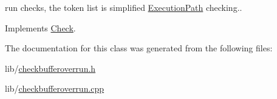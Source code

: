run checks, the token list is simplified \hyperlink{class_execution_path}{Execution\-Path} checking.. 

Implements \hyperlink{class_check_a112445eed1625599b93c69aab4701e5e}{Check}.



The documentation for this class was generated from the following files\-:\begin{DoxyCompactItemize}
\item 
lib/\hyperlink{checkbufferoverrun_8h}{checkbufferoverrun.\-h}\item 
lib/\hyperlink{checkbufferoverrun_8cpp}{checkbufferoverrun.\-cpp}\end{DoxyCompactItemize}
